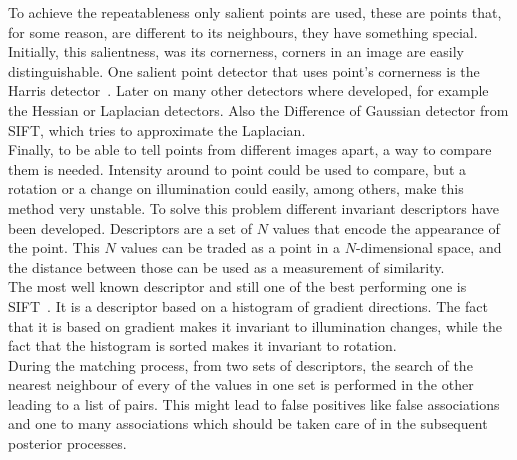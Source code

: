 To achieve the repeatableness only salient points are used, these are points that, for some reason, are different to its neighbours, they have something special. Initially, this salientness, was its cornerness, corners in an image are easily distinguishable. One salient point detector that uses point's cornerness is the Harris detector~\cite{harris1988combined}. Later on many other detectors where developed, for example the Hessian or Laplacian detectors. Also the Difference of Gaussian detector from SIFT, which tries to approximate the Laplacian.\\

Finally, to be able to tell points from different images apart, a way to compare them is needed. Intensity around to point could be used to compare, but a rotation or a change on illumination could easily, among others, make this method very unstable. To solve this problem different invariant descriptors have been developed. Descriptors are a set of $N$ values that encode the appearance of the point. This $N$ values can be traded as a point in a $N$-dimensional space, and the distance between those can be used as a measurement of similarity.\\

The most well known descriptor and still one of the best performing one is SIFT~\cite{lowe2004distinctive}. It is a descriptor based on a histogram of gradient directions. The fact that it is based on gradient makes it invariant to illumination changes, while the fact that the histogram is sorted makes it invariant to rotation.\\

During the matching process, from two sets of descriptors, the search of the nearest neighbour of every of the values in one set is performed in the other leading to a list of pairs. This might lead to false positives like false associations and one to many associations which should be taken care of in the subsequent posterior processes.\\





